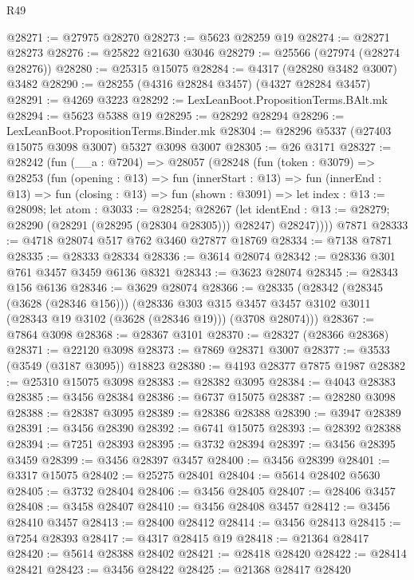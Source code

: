 \begin{lexlean}{R49}
\begin{coremodule}
@28271 := @27975 @28270
@28273 := @5623 @28259 @19
@28274 := @28271 @28273
@28276 := @25822 @21630 @3046
@28279 := @25566 (@27974 (@28274 @28276))
@28280 := @25315 @15075
@28284 := @4317 (@28280 @3482 @3007) @3482
@28290 := @28255 (@4316 @28284 @3457) (@4327 @28284 @3457)
@28291 := @4269 @3223
@28292 := LexLeanBoot.PropositionTerms.BAlt.mk
@28294 := @5623 @5388 @19
@28295 := @28292 @28294
@28296 := LexLeanBoot.PropositionTerms.Binder.mk
@28304 := @28296 @5337 (@27403 @15075 @3098 @3007) @5327 @3098 @3007
@28305 := @26 @3171
@28327 := @28242
    (fun (__a : @7204) =>
    @28057
      (@28248
        (fun (token : @3079) =>
        @28253
          (fun (opening : @13) =>
          fun (innerStart : @13) =>
          fun (innerEnd : @13) =>
          fun (closing : @13) =>
          fun (shown : @3091) =>
          let index : @13 := @28098;
          let atom : @3033 := @28254;
          @28267
            (let identEnd : @13 := @28279; @28290 (@28291 (@28295 (@28304 @28305))) @28247)
            @28247))))
    @7871
@28333 := @4718 @28074 @517 @762 @3460 @27877 @18769
@28334 := @7138 @7871
@28335 := @28333 @28334
@28336 := @3614 @28074
@28342 := @28336 @301 @761 @3457 @3459 @6136 @8321
@28343 := @3623 @28074
@28345 := @28343 @156 @6136
@28346 := @3629 @28074
@28366 := @28335
    (@28342
      (@28345 (@3628 (@28346 @156)))
      (@28336
        @303
        @315
        @3457
        @3457
        @3102
        @3011
        (@28343 @19 @3102 (@3628 (@28346 @19)))
        (@3708 @28074)))
@28367 := @7864 @3098
@28368 := @28367 @3101
@28370 := @28327 (@28366 @28368)
@28371 := @22120 @3098
@28373 := @7869 @28371 @3007
@28377 := @3533 (@3549 (@3187 @3095)) @18823
@28380 := @4193 @28377 @7875 @1987
@28382 := @25310 @15075 @3098
@28383 := @28382 @3095
@28384 := @4043 @28383
@28385 := @3456 @28384
@28386 := @6737 @15075
@28387 := @28280 @3098
@28388 := @28387 @3095
@28389 := @28386 @28388
@28390 := @3947 @28389
@28391 := @3456 @28390
@28392 := @6741 @15075
@28393 := @28392 @28388
@28394 := @7251 @28393
@28395 := @3732 @28394
@28397 := @3456 @28395 @3459
@28399 := @3456 @28397 @3457
@28400 := @3456 @28399
@28401 := @3317 @15075
@28402 := @25275 @28401
@28404 := @5614 @28402 @5630
@28405 := @3732 @28404
@28406 := @3456 @28405
@28407 := @28406 @3457
@28408 := @3458 @28407
@28410 := @3456 @28408 @3457
@28412 := @3456 @28410 @3457
@28413 := @28400 @28412
@28414 := @3456 @28413
@28415 := @7254 @28393
@28417 := @4317 @28415 @19
@28418 := @21364 @28417
@28420 := @5614 @28388 @28402
@28421 := @28418 @28420
@28422 := @28414 @28421
@28423 := @3456 @28422
@28425 := @21368 @28417 @28420

\end{coremodule}
\end{lexlean}
